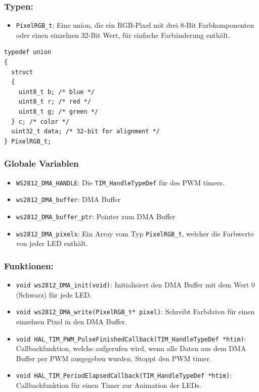 \subsubsection*{Typen:}
{\renewcommand\labelitemi{}
\begin{itemize}[leftmargin=*]
    \item \texttt{PixelRGB\_t}: Eine union, die ein RGB-Pixel mit drei 8-Bit Farbkomponenten oder einen einzelnen 32-Bit Wert, für einfache Farbänderung enthält.
\end{itemize}
}
\begin{lstlisting}[style=CStyle]
typedef union
{
  struct
  {
    uint8_t b; /* blue */
    uint8_t r; /* red */
    uint8_t g; /* green */
  } c; /* color */
  uint32_t data; /* 32-bit for alignment */
} PixelRGB_t;
\end{lstlisting}

\subsubsection*{Globale Variablen}
{\renewcommand\labelitemi{}
\begin{itemize}[leftmargin=*]
    \item \texttt{WS2812\_DMA\_HANDLE}: Die \texttt{TIM\_HandleTypeDef} für des PWM timers.
    \item \texttt{ws2812\_DMA\_buffer}: DMA Buffer
    \item \texttt{ws2812\_DMA\_buffer\_ptr}: Pointer zum DMA Buffer
    \item \texttt{ws2812\_DMA\_pixels}: Ein Array vom Typ \texttt{PixelRGB\_t}, welcher die Farbwerte von jeder LED enthält.
\end{itemize}
}

\subsubsection*{Funktionen:}
{\renewcommand\labelitemi{}
\begin{itemize}[leftmargin=*]
    \item \texttt{void ws2812\_DMA\_init(void)}: Initialisiert den DMA Buffer mit dem Wert 0 (Schwarz) für jede LED.
    \item \texttt{void ws2812\_DMA\_write(PixelRGB\_t* pixel)}: Schreibt Farbdaten für einen einzelnen Pixel in den DMA Buffer.
    \item \texttt{void HAL\_TIM\_PWM\_PulseFinishedCallback(TIM\_HandleTypeDef *htim)}: Callbackfunktion, welche aufgerufen wird, wenn alle Daten aus dem DMA Buffer per PWM ausgegeben wurden. Stoppt den PWM timer.
    \item \texttt{void HAL\_TIM\_PeriodElapsedCallback(TIM\_HandleTypeDef *htim)}: Callbackfunktion für einen Timer zur Animation der LEDs.
\end{itemize}
}

